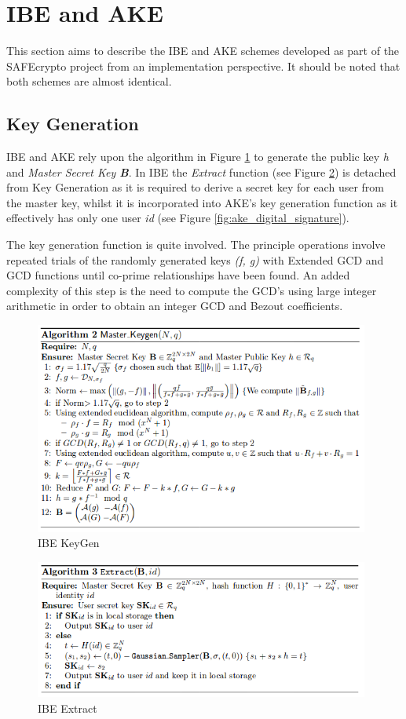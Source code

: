 \section{IBE and AKE}

This section aims to describe the IBE and AKE schemes developed as part of the SAFEcrypto project from an implementation perspective. It should be noted that both schemes are almost identical.

\subsection{Key Generation}

IBE and AKE rely upon the algorithm in Figure \ref{fig:ibe_keygen} to generate the public key \textit{h} and \textit{Master Secret Key \textbf{B}}. In IBE the \textit{Extract} function (see Figure \ref{fig:ibe_extract}) is detached from Key Generation as it is required to derive a secret key for each user from the master key, whilst it is incorporated into AKE's key generation function as it effectively has only one user \textit{id} (see Figure \ref{fig:ake_digital_signature}).

The key generation function is quite involved. The principle operations involve repeated trials of the randomly generated keys \textit{(f, g)} with Extended GCD and GCD functions until co-prime relationships have been found. An added complexity of this step is the need to compute the GCD's using large integer arithmetic in order to obtain an integer GCD and Bezout coefficients.

\begin{figure}[H]
\centering
\includegraphics[width=11cm]{ibe_keygen.png}
\caption{IBE KeyGen}
\label{fig:ibe_keygen}
\end{figure}

\begin{figure}[H]
\centering
\includegraphics[width=11cm]{ibe_extract.png}
\caption{IBE Extract}
\label{fig:ibe_extract}
\end{figure}

